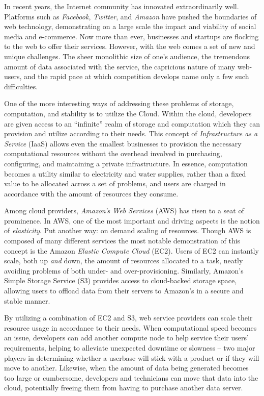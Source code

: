 In recent years, the Internet community has innovated extraordinarily well.
Platforms such as \emph{Facebook}, \emph{Twitter}, and \emph{Amazon} have
pushed the boundaries of web technology, demonstrating on a large scale the
impact and viability of social media and e-commerce. Now more than ever,
businesses and startups are flocking to the web to offer their services.
However, with the web comes a set of new and unique challenges. The sheer
monolithic size of one's audience, the tremendous amount of data associated
with the service, the capricious nature of many web-users, and the rapid pace
at which competition develops name only a few such difficulties.

One of the more interesting ways of addressing these problems of storage,
computation, and stability is to utilize the Cloud. Within the cloud,
developers are given access to an ``infinite'' realm of storage and computation
which they can provision and utilize according to their needs. This concept of
\emph{Infrastructure as a Service} (IaaS) allows even the smallest businesses
to provision the necessary computational resources without the overhead
involved in purchasing, configuring, and maintaining a private infrastructure.
In essence, computation becomes a utility similar to electricity and water
supplies, rather than a fixed value to be allocated across a set of problems,
and users are charged in accordance with the amount of resources they consume.

Among cloud providers, \emph{Amazon's Web Services} (AWS) has risen to a seat
of prominence. In AWS, one of the most important and driving aspects is the
notion of \emph{elasticity}. Put another way: on demand scaling of resources.
Though AWS is composed of many different services the most notable
demonstration of this concept is the Amazon \emph{Elastic Compute Cloud} (EC2).
Users of EC2 can instantly scale, both up \emph{and} down, the amount of
resources allocated to a task, neatly avoiding problems of both under- and
over-provisioning.  Similarly, Amazon's Simple Storage Service (S3) provides
access to cloud-backed storage space, allowing users to offload data from their
servers to Amazon's in a secure and stable manner.

By utilizing a combination of EC2 and S3, web service providers can scale their
resource usage in accordance to their needs. When computational speed becomes
an issue, developers can add another compute node to help service their users'
requirements, helping to alleviate unexpected downtime or slowness -- two major
players in determining whether a userbase will stick with a product or if they
will move to another. Likewise, when the amount of data being generated becomes
too large or cumbersome, developers and technicians can move that data into the
cloud, potentially freeing them from having to purchase another data server.

